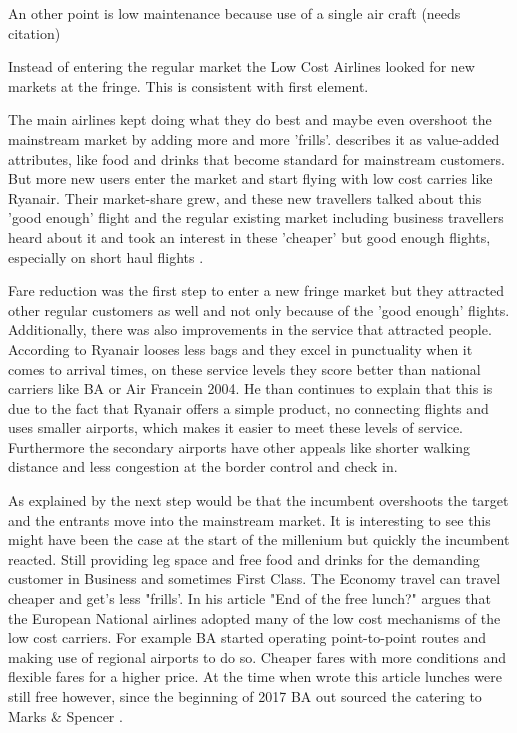 \documentclass[a4paper, 11pt]{article}
\begin{document}
An other point is low maintenance because use of a single air craft (needs citation)

Instead of entering the regular market the Low Cost Airlines looked for new markets at the fringe. This is consistent with \cite{Christensen} first element.


The main airlines kept doing what they do best and maybe even overshoot the mainstream market by adding more and more 'frills'. \cite{Droege} describes it as value-added attributes, like food and drinks that become standard for mainstream customers. But more new users enter the market and start flying with low cost carries like Ryanair. Their market-share grew, and these new travellers talked about this 'good enough' flight and the regular existing market including business travellers heard about it and took an interest in these 'cheaper' but good enough flights, especially on short haul flights \citep{TiddBessant}.

Fare reduction was the first step to enter a new fringe market but they attracted other regular customers as well and not only because of the 'good enough' flights. Additionally, there was also improvements in the service that attracted people. According to \cite{Barrett} Ryanair looses less bags and they excel in punctuality when it comes to arrival times, on these service levels they score better than national carriers like BA or Air Francein 2004. He \citep{Barrett} than continues to explain that this is due to the fact that Ryanair offers a simple product, no connecting flights and uses smaller airports, which makes it easier to meet these levels of service. Furthermore the secondary airports have other appeals like shorter walking distance and less congestion at the border control and check in.

As explained by \cite{chistensen} the next step would be that the incumbent overshoots the target and the entrants move into
the mainstream market. It is interesting to see this might have been the case at the start of the millenium but quickly the
incumbent reacted. Still providing leg space and free food and drinks for the demanding customer in Business and sometimes
First Class. The Economy travel can travel cheaper and get's less "frills'. In his article "End of the free lunch?"
\cite{Dennis} argues that the European National airlines adopted many of the low cost mechanisms of the low cost carriers. For
example BA started operating point-to-point routes and making use of regional airports to do so. Cheaper fares with more
conditions and flexible fares for a higher price. At the time when \cite{Dennis} wrote this article lunches were still free
however, since the beginning of 2017 BA out sourced the catering to Marks \& Spencer \citep{calder}.
\end{document}
